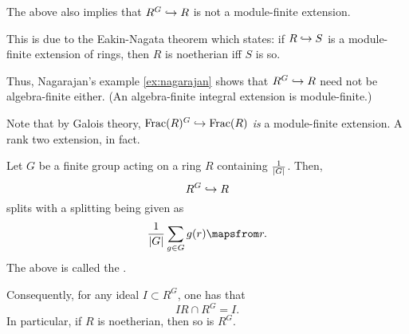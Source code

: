 \documentclass[12pt]{article}
\begin{document}
\begin{rem}
	The above also implies that $R^{G} \hookrightarrow R$ is not a module-finite extension.

	This is due to the Eakin-Nagata theorem which states: if $R \hookrightarrow S$ is a module-finite extension of rings, then $R$ is noetherian iff $S$ is so.
	
	Thus, Nagarajan's example \ref{ex:nagarajan} shows that $R^{G} \hookrightarrow R$ need not be algebra-finite either. (An algebra-finite integral extension is module-finite.)

	Note that by Galois theory, $\operatorname{Frac}(R)^{G} \hookrightarrow \operatorname{Frac}(R)$ \emph{is} a module-finite extension. A rank two extension, in fact.
\end{rem}

\begin{thm}
	Let $G$ be a finite group acting on a ring $R$ containing $\frac{1}{{\left\lvert G \right\lvert}}$. Then,
	\begin{equation*} 
		R^{G} \hookrightarrow R
	\end{equation*}
	splits with a splitting being given as
	\begin{equation*} 
		\frac{1}{\md{G}} \sum_{g \in G} g(r) \mapsfrom r.
	\end{equation*}
	The above is called the .

	Consequently, for any ideal $I \subset R^{G}$, one has that
	\begin{equation*} 
		IR \cap R^{G} = I.
	\end{equation*}
	In particular, if $R$ is noetherian, then so is $R^{G}$.
\end{thm}
\end{document}
